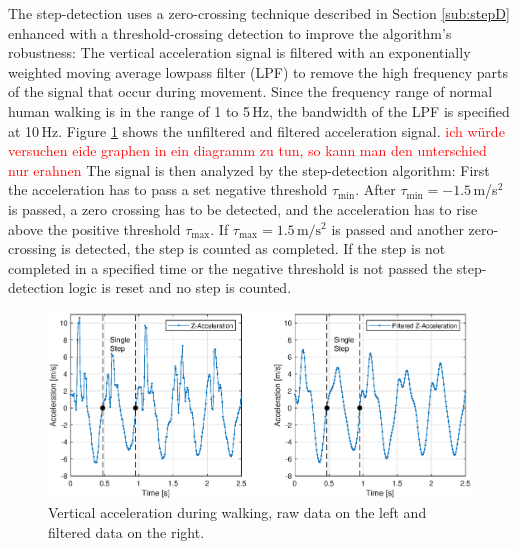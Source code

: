 \documentclass[engproc,conferenceproceedings,submit,pdftex,moreauthors]{Definitions/mdpi}
\begin{document}
 The step-detection uses a zero-crossing technique described in Section \ref{sub:stepD} enhanced with a threshold-crossing detection to improve the algorithm's robustness: The vertical acceleration signal is filtered with an exponentially weighted moving average lowpass filter (LPF) to remove the high frequency parts of the signal that occur during movement. Since the frequency range of normal human walking is in the range of 1 to 5\,Hz, the bandwidth of the LPF is specified at 10\,Hz. Figure \ref{fig:AccelWalk} shows the unfiltered and filtered acceleration signal. \textcolor{red}{ich würde versuchen eide graphen in ein diagramm zu tun, so kann man den unterschied nur erahnen} The signal is then analyzed by the step-detection algorithm: First the acceleration has to pass a set negative threshold $\tau_{\min}$. After $\tau_{\min} = -1.5$\,m/s$^2$ is passed, a zero crossing has to be detected, and the acceleration has to rise above the positive threshold $\tau_{\max}$. If $\tau_{\max} = 1.5\,\mathrm{m/s^2}$ is passed and another zero-crossing is detected, the step is counted as completed. If the step is not completed in a specified time or the negative threshold is not passed the step-detection logic is reset and no step is counted. 
\begin{figure}[h!]
	\centering
	\includegraphics[width=\textwidth]{WalkAcceleration.eps}
	\caption{Vertical acceleration during walking, raw data on the left and filtered data on the right.}
	\label{fig:AccelWalk}
\end{figure}


%	
\end{document}
